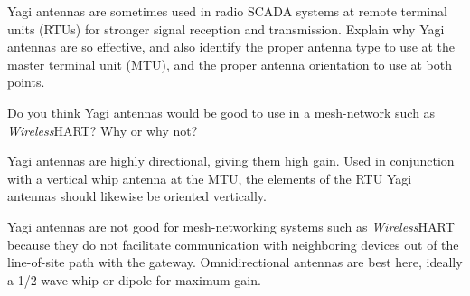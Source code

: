 

Yagi antennas are sometimes used in radio SCADA systems at remote terminal units (RTUs) for stronger signal reception and transmission.  Explain why Yagi antennas are so effective, and also identify the proper antenna type to use at the master terminal unit (MTU), and the proper antenna orientation to use at both points.

\vskip 10pt

Do you think Yagi antennas would be good to use in a mesh-network such as {\sl Wireless}HART?  Why or why not?







Yagi antennas are highly directional, giving them high gain.  Used in conjunction with a vertical whip antenna at the MTU, the elements of the RTU Yagi antennas should likewise be oriented vertically.

\vskip 10pt

Yagi antennas are not good for mesh-networking systems such as {\sl Wireless}HART because they do not facilitate communication with neighboring devices out of the line-of-site path with the gateway.  Omnidirectional antennas are best here, ideally a 1/2 wave whip or dipole for maximum gain.











